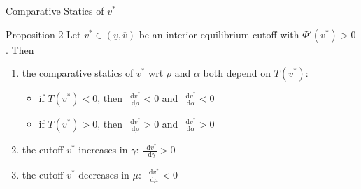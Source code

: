 \documentclass[11pt,aspectratio=169]{beamer}
\newcommand*\diff{\mathop{}\!\mathrm{d}}
\begin{document}
\begin{frame}{Comparative Statics of $v^*$}

\begin{exampleblock}{Proposition 2}
    Let $v^*\in (\underline{v},\overline{v})$ be an interior equilibrium cutoff with $\Phi'(v^*)>0$. Then
    \begin{enumerate}
        \item the comparative statics of $v^*$ wrt $\rho$ and $\alpha$ both depend on $T(v^*)$:
        \begin{itemize}
            \item if $T(v^*)<0$, then $\frac{\diff v^*}{\diff \rho}<0$ and $\frac{\diff v^*}{\diff \alpha}<0$
            \item if $T(v^*)>0$, then $\frac{\diff v^*}{\diff \rho}>0$ and $\frac{\diff v^*}{\diff \alpha}>0$
        \end{itemize}
        \item the cutoff $v^*$ increases in $\gamma$: $\frac{\diff v^*}{\diff \gamma}>0$
        \item the cutoff $v^*$ decreases in $\mu$: $\frac{\diff v^*}{\diff \mu}<0$
    \end{enumerate}
\end{exampleblock}
    
\end{frame}
\end{document}
